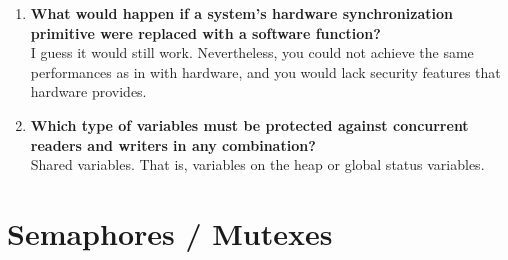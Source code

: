 \documentclass[a4paper]{article}
\begin{document}
\begin{enumerate}
  \item {\bf  What would happen if a system’s hardware synchronization primitive were replaced with a software function? } \\
    I guess it would still work. Nevertheless, you could not achieve the same performances as in with hardware, and you would lack security features that hardware provides.

  \item {\bf  Which type of variables must be protected against concurrent readers and writers in any combination?} \\
    Shared variables. That is, variables on the heap or global status variables.

\end{enumerate}

\section{Semaphores / Mutexes} %
\label{sec:Semaphores / Mutexes}
\end{document}
